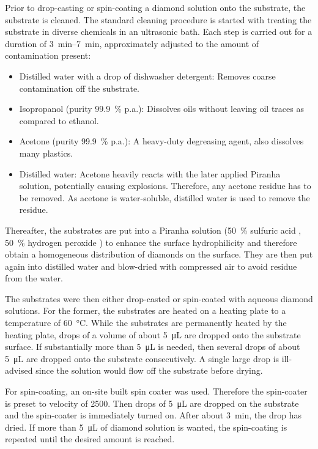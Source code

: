 		Prior to drop-casting or spin-coating a diamond solution onto the \ir substrate, the substrate is cleaned.
		The standard cleaning procedure is started with treating the substrate in diverse chemicals in an ultrasonic bath.
		Each step is carried out for a duration of \SIrange{3}{7}{\minute}, approximately adjusted to the amount of contamination present:

		\begin{itemize}
			\item Distilled water with a drop of dishwasher detergent: Removes coarse contamination off the substrate.
			\item Isopropanol (purity \SI{99.9}{\percent} p.a.): Dissolves oils without leaving oil traces as compared to ethanol.
			\item Acetone (purity \SI{99.9}{\percent} p.a.): A heavy-duty degreasing agent, also dissolves many plastics.
			\item Distilled water: Acetone heavily reacts with the later applied Piranha solution, potentially causing explosions. Therefore, any acetone residue has to be removed. As acetone is water-soluble, distilled water is used to remove the residue.
		\end{itemize}

		Thereafter, the substrates are put into a Piranha solution (\SI{50}{\percent} sulfuric acid , \SI{50}{\percent} hydrogen peroxide ) to enhance the surface hydrophilicity and therefore obtain a homogeneous distribution of diamonds on the surface.
		They are then put again into distilled water and blow-dried with compressed air to avoid residue from the water.

		The substrates were then either drop-casted or spin-coated with aqueous diamond solutions.
		For the former, the substrates are heated on a heating plate to a temperature of \SI{60}{\celsius}.
		While the substrates are permanently heated by the heating plate, drops of a volume of about \SI{5}{\micro\liter} are dropped onto the substrate surface.
		If substantially more than \SI{5}{\micro\liter} is needed, then several drops of about \SI{5}{\micro\liter} are dropped onto the substrate consecutively. A single large drop is ill-advised since the solution would flow off the substrate before drying.

		For spin-coating, an on-site built spin coater was used.
		Therefore the spin-coater is preset to velocity of \SI{2500}{\rpm}.
		Then drops of \SI{5}{\micro\liter} are dropped on the substrate and the spin-coater is immediately turned on.
		After about \SI{3}{\minute}, the drop has dried.
		If more than \SI{5}{\micro\liter} of diamond solution is wanted, the spin-coating is repeated until the desired amount is reached.


